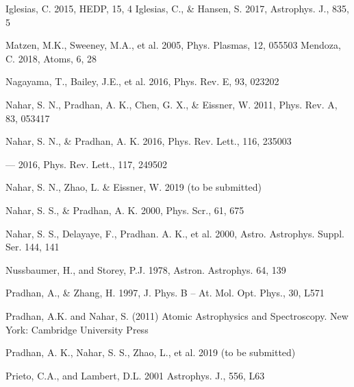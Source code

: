 \documentclass[11pt, double, phd]{osudiss-2}
\begin{document}
\begin {thebibliography} {}
 Iglesias, C. 2015, HEDP, 15, 4
 Iglesias, C., \& Hansen, S. 2017, Astrophys. J., 835, 5

 Matzen, M.K., Sweeney, M.A., et al. 2005, Phys. Plasmas, 12, 055503
 Mendoza, C. 2018, Atoms, 6, 28

 Nagayama, T., Bailey, J.E., et al. 2016, Phys. Rev. E, 93, 023202

 Nahar, S. N., Pradhan, A. K., Chen, G. X., \& Eissner, W. 2011, Phys. Rev. A, 83, 053417

 Nahar, S. N., \& Pradhan, A. K. 2016{}, Phys. Rev. Lett., 116, 235003

 --- 2016{}, Phys. Rev. Lett., 117, 249502

 Nahar, S. N., Zhao, L. \& Eissner, W. 2019 (to be submitted)

 Nahar, S. S., \& Pradhan, A. K. 2000, Phys. Scr., 61, 675

 Nahar, S. S., Delayaye, F., Pradhan. A. K., et al. 2000, Astro. Astrophys. Suppl. Ser. 144, 141

 Nussbaumer, H., and Storey, P.J. 1978, Astron. Astrophys. 64, 139

 Pradhan, A., \& Zhang, H.
1997, J. Phys. B -- At. Mol. Opt. Phys., 30, L571

 Pradhan, A.K. and Nahar, S. (2011) Atomic Astrophysics and Spectroscopy. New York: Cambridge University Press

 Pradhan, A. K., Nahar, S. S., Zhao, L., et al. 2019 (to be submitted)

 Prieto, C.A., and Lambert, D.L. 2001 Astrophys. J., 556, L63


\end{thebibliography}
\end{document}
